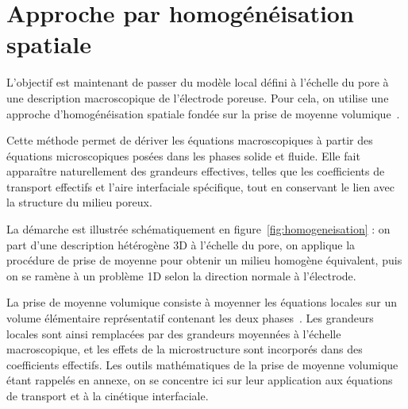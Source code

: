 \maketitle
\vspace{-1.5cm}

\section*{Approche par homogénéisation spatiale}
L'objectif est maintenant de passer du modèle local défini à l'échelle du
pore à une description macroscopique de l'électrode poreuse. Pour cela, on
utilise une approche d'homogénéisation spatiale fondée sur la prise de
moyenne volumique~\cite{whitakerMethodVolumeAveraging1999,
leMultiscaleModelingDiffusion2017}.

Cette méthode permet de dériver les équations macroscopiques à partir des
équations microscopiques posées dans les phases solide et fluide. Elle fait
apparaître naturellement des grandeurs effectives, telles que les coefficients
de transport effectifs et l'aire interfaciale spécifique, tout en conservant
le lien avec la structure du milieu poreux.

La démarche est illustrée schématiquement en figure~\ref{fig:homogeneisation} :
on part d'une description hétérogène 3D à l'échelle du pore, on applique
la procédure de prise de moyenne pour obtenir un milieu homogène équivalent,
puis on se ramène à un problème 1D selon la direction normale à l'électrode.



La prise de moyenne volumique consiste à moyenner les équations locales sur un volume élémentaire
représentatif contenant les deux phases~\cite{whitakerMethodVolumeAveraging1999, leMultiscaleModelingDiffusion2017}. Les grandeurs locales sont
ainsi remplacées par des grandeurs moyennées à l'échelle macroscopique,
et les effets de la microstructure sont incorporés dans des coefficients
effectifs. Les outils mathématiques de la prise de moyenne volumique étant rappelés en
annexe, on se concentre ici sur leur application aux équations de transport
et à la cinétique interfaciale.


